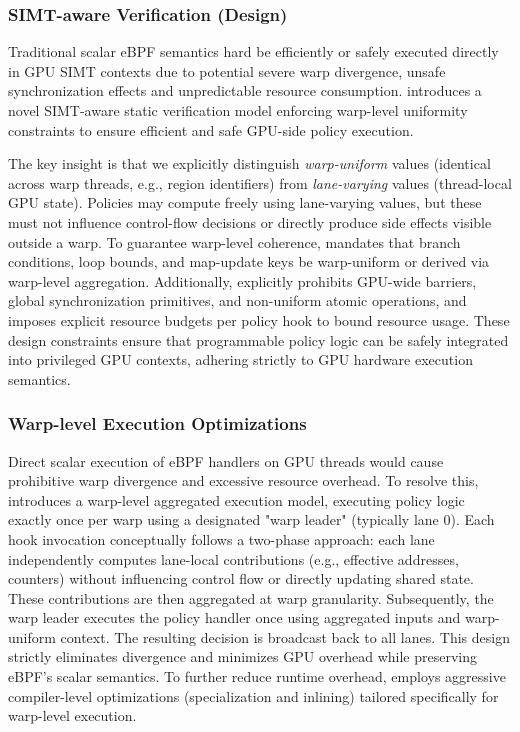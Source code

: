 \subsubsection{SIMT-aware Verification (Design)}

Traditional scalar eBPF semantics hard be efficiently or safely executed directly in GPU SIMT contexts due to potential severe warp divergence, unsafe synchronization effects and unpredictable resource consumption. \sys introduces a novel SIMT-aware static verification model enforcing warp-level uniformity constraints to ensure efficient and safe GPU-side policy execution.

The key insight is that we explicitly distinguish \emph{warp-uniform} values (identical across warp threads, e.g., region identifiers) from \emph{lane-varying} values (thread-local GPU state). Policies may compute freely using lane-varying values, but these must not influence control-flow decisions or directly produce side effects visible outside a warp. To guarantee warp-level coherence, \sys mandates that branch conditions, loop bounds, and map-update keys be warp-uniform or derived via warp-level aggregation. Additionally, \sys explicitly prohibits GPU-wide barriers, global synchronization primitives, and non-uniform atomic operations, and imposes explicit resource budgets per policy hook to bound resource usage. These design constraints ensure that programmable policy logic can be safely integrated into privileged GPU contexts, adhering strictly to GPU hardware execution semantics.

\subsubsection{Warp-level Execution Optimizations}

Direct scalar execution of eBPF handlers on GPU threads would cause prohibitive warp divergence and excessive resource overhead. To resolve this, \sys introduces a warp-level aggregated execution model, executing policy logic exactly once per warp using a designated "warp leader" (typically lane 0). Each hook invocation conceptually follows a two-phase approach: each lane independently computes lane-local contributions (e.g., effective addresses, counters) without influencing control flow or directly updating shared state. These contributions are then aggregated at warp granularity. Subsequently, the warp leader executes the policy handler once using aggregated inputs and warp-uniform context. The resulting decision is broadcast back to all lanes. This design strictly eliminates divergence and minimizes GPU overhead while preserving eBPF's scalar semantics. To further reduce runtime overhead, \sys employs aggressive compiler-level optimizations (specialization and inlining) tailored specifically for warp-level execution.

